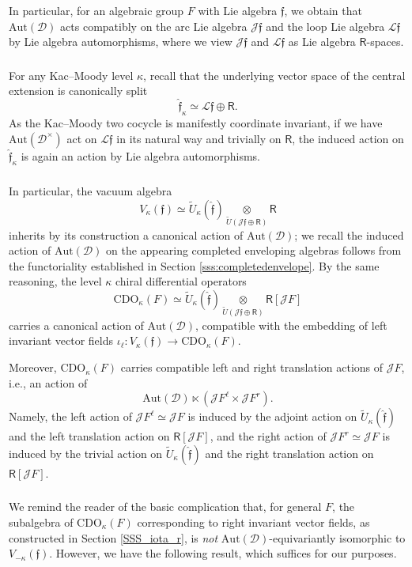 \documentclass{amsart}
\theoremstyle{definition}
\newcommand{\sss}{\subsubsection{}}
\newcommand{\sD}{\mathscr{D}}
\newcommand{\on}{\mathrm}
\newcommand{\Ring}{\mathsf{R}}
\newcommand{\Jet}{\mathscr{J}}
\newcommand{\Loop}{\mathscr{L}}
\newcommand{\ff}{\mathfrak{f}}
\newcommand{\CDO}{\mathrm{CDO}}
\newcommand{\pD}{\sD^\times}
\newcommand{\Aut}{\on{Aut}}
\numberwithin{equation}{section}
\begin{document}
In particular, for an algebraic group $F$ with Lie algebra $\ff$, we obtain that $\Aut(\sD)$ acts compatibly on the arc Lie algebra $\Jet \ff$ and the loop Lie algebra $\Loop \ff$ by Lie algebra automorphisms, where we view $\Jet \ff$ and $\Loop \ff$ as Lie algebra $\Ring$-spaces. 

\sss For any Kac--Moody level $\kappa$, recall that the underlying vector space of the central extension is canonically split 
$$\hat{\ff}_\kappa \simeq \Loop \ff \oplus \Ring.$$
As the Kac--Moody two cocycle is manifestly coordinate invariant, if we have $\Aut(\pD)$ act on $\Loop \ff$ in its natural way and trivially on $\Ring$, the induced action on $\hat{\ff}_\kappa$ is again an action by Lie algebra automorphisms. 
  

\sss \label{sss_jetscdoaction} In particular, the vacuum algebra 
$$V_\kappa(\ff) \simeq \widetilde{U}_\kappa(\hat{\ff}) \underset{\widetilde{U}( \Jet \ff \oplus \Ring )} \otimes \Ring $$
inherits by its construction a canonical action of $\Aut(\sD)$; we recall the induced action of $\Aut(\sD)$ on the appearing completed enveloping algebras follows from the functoriality established in Section \ref{sss:completedenvelope}. By the same reasoning, the level $\kappa$ chiral differential operators 
$$\CDO_\kappa(F) \simeq \widetilde{U}_\kappa(\hat{\ff}) \underset{\widetilde{U}( \Jet \ff \oplus \Ring )} \otimes \Ring[\Jet F] $$
carries a canonical action of $\Aut(\sD)$, compatible with the embedding of left invariant vector fields $\iota_\ell: V_\kappa(\ff) \rightarrow \CDO_\kappa(F)$. 

Moreover, $\CDO_\kappa(F)$ carries compatible left and right translation actions of $\Jet F$, i.e., an action of $$\Aut(\sD) \ltimes (\Jet F^\ell \times \Jet F^r).$$Namely, the left action of $\Jet F^\ell \simeq \Jet F$ is induced by the adjoint action on $\widetilde{U}_\kappa(\hat{\ff})$ and the left translation action on $\Ring[\Jet F]$, and the right action of $\Jet F^r \simeq \Jet F$ is induced by the trivial action on $\widetilde{U}_\kappa(\hat{\ff})$ and the right translation action on $\Ring[\Jet F]$. 



\sss{} \label{re:rightCDO} We remind the reader of the basic complication that, for general $F$, the subalgebra of $\CDO_\kappa(F)$ corresponding to right invariant vector fields, as constructed in Section \ref{SSS_iota_r}, is {\em not} $\Aut(\sD)$-equivariantly isomorphic to $V_{-\kappa}(\ff)$. However, we have the following result, which suffices for our purposes. 
\end{document}
